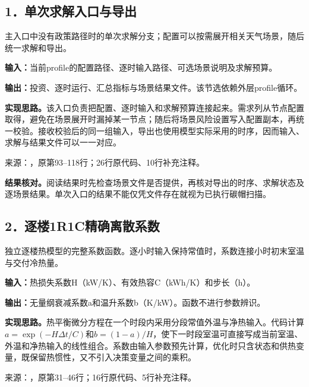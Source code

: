 \subsection*{1．单次求解入口与导出}
主入口中没有政策路径时的单次求解分支；配置可以按需展开相关天气场景，随后统一求解和导出。

\noindent\textbf{输入：}当前profile的配置路径、逐时输入路径、可选场景说明及求解预算。\par
\noindent\textbf{输出：}投资、逐时运行、汇总指标与场景结果文件。该节选依赖外层profile循环。\par

\noindent\textbf{实现思路。}该入口负责把配置、逐时输入和求解预算连接起来。需求列从节点配置取得，避免在场景展开时漏掉某一节点；随后将场景风险设置写入配置副本，再统一校验。接收校验后的同一组输入，导出也使用模型实际采用的时序，因而输入、求解与结果文件可以一一对应。

{\small 来源：，原第93--118行；26行原代码、10行补充注释。}\par

\begingroup
{}

\endgroup

\noindent\textbf{结果核对。}阅读结果时先检查场景文件是否提供，再核对导出的时序、求解状态及逐场景结果。单次入口的结果不能仅凭文件存在就视为已执行碳帽扫描。

\subsection*{2．逐楼1R1C精确离散系数}
独立逐楼热模型的完整系数函数。逐小时输入保持常值时，系数连接小时初末室温与交付冷热量。

\noindent\textbf{输入：}热损失系数H（kW/K）、有效热容C（kWh/K）和步长（h）。\par
\noindent\textbf{输出：}无量纲衰减系数a和温升系数b（K/kW）。函数不进行参数辨识。\par

\noindent\textbf{实现思路。}热平衡微分方程在一个时段内采用分段常值外温与净热输入。代码计算$a=\exp(-H\Delta t/C)$和$b=(1-a)/H$，使下一时段室温可直接写成当前室温、外温和净热输入的线性组合。系数由输入参数预先计算，优化时只含状态和供热变量，既保留热惯性，又不引入决策变量之间的乘积。

{\small 来源：，原第31--46行；16行原代码、5行补充注释。}\par

\begingroup
{}

\endgroup

